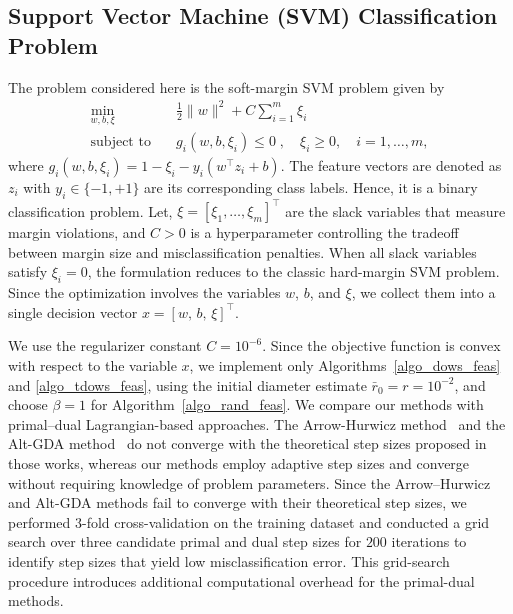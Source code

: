 \documentclass{article}
\theoremstyle{plain}
\theoremstyle{definition}
\theoremstyle{remark}
\begin{document}
\subsection{Support Vector Machine (SVM) Classification Problem}

The problem considered here is the soft-margin SVM problem given by
\begin{align*}
    \min_{w, b, \xi} \quad & \frac{1}{2}\|w\|^2 + C \sum_{i=1}^m \xi_i \\
    \text{subject to} \quad 
    & g_i(w,b,\xi_i) \leq 0 \;, \quad \xi_i \ge 0,\quad i = 1, \ldots, m ,
\end{align*}
where $g_i(w,b,\xi_i) = 1 - \xi_i - y_i (w^\top z_i + b)$. The feature vectors are denoted as $z_i$ with $y_i \in \{-1, +1\}$ are its corresponding class labels. Hence, it is a binary classification problem. Let, $\xi = [\xi_1, \ldots, \xi_m]^\top$ are the slack variables that measure margin violations, and $C>0$ is a hyperparameter controlling the tradeoff between margin size and misclassification penalties. When all slack variables satisfy $\xi_i = 0$, the formulation reduces to the classic hard-margin SVM problem. Since the optimization involves the variables $w$, $b$, and $\xi$, we collect them into a single decision vector $x = [w,\, b,\, \xi]^\top$.

We use the regularizer constant $C = 10^{-6}$. Since the objective function is convex with respect to the variable $x$, we implement only Algorithms~\ref{algo_dows_feas} and \ref{algo_tdows_feas}, using the initial diameter estimate $\bar r_0 = r = 10^{-2}$, and choose $\beta = 1$ for Algorithm~\ref{algo_rand_feas}. We compare our methods with primal–dual Lagrangian-based approaches. The Arrow-Hurwicz method~\cite{he2022convergence} and the Alt-GDA method~\cite{zhang2022near} do not converge with the theoretical step sizes proposed in those works, whereas our methods employ adaptive step sizes and converge without requiring knowledge of problem parameters. Since the Arrow–Hurwicz and Alt-GDA methods fail to converge with their theoretical step sizes, we performed $3$-fold cross-validation on the training dataset and conducted a grid search over three candidate primal and dual step sizes for $200$ iterations to identify step sizes that yield low misclassification error. This grid-search procedure introduces additional computational overhead for the primal-dual methods.
\end{document}
